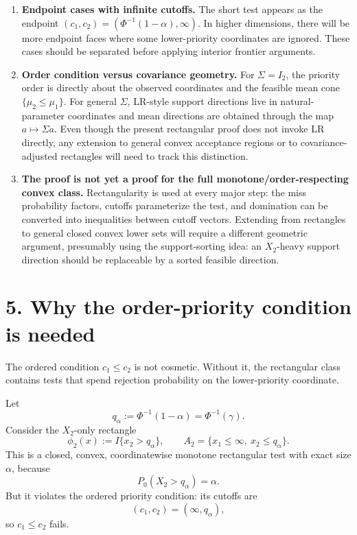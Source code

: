\documentclass[12pt]{article}
\theoremstyle{definition}
\theoremstyle{remark}
\begin{document}
\begin{enumerate}[label=\textbf{(E\arabic*)},leftmargin=2.4em]
\item \textbf{Endpoint cases with infinite cutoffs.}
The short test appears as the endpoint $(c_1,c_2)=(\Phi^{-1}(1-\alpha),\infty)$. In higher dimensions, there will be more endpoint faces where some lower-priority coordinates are ignored. These cases should be separated before applying interior frontier arguments.

\item \textbf{Order condition versus covariance geometry.}
For $\Sigma=I_2$, the priority order is directly about the observed coordinates and the feasible mean cone $\{\mu_2\le\mu_1\}$. For general $\Sigma$, LR-style support directions live in natural-parameter coordinates and mean directions are obtained through the map $a\mapsto\Sigma a$. Even though the present rectangular proof does not invoke LR directly, any extension to general convex acceptance regions or to covariance-adjusted rectangles will need to track this distinction.

\item \textbf{The proof is not yet a proof for the full monotone/order-respecting convex class.}
Rectangularity is used at every major step: the miss probability factors, cutoffs parameterize the test, and domination can be converted into inequalities between cutoff vectors. Extending from rectangles to general closed convex lower sets will require a different geometric argument, presumably using the support-sorting idea: an $X_2$-heavy support direction should be replaceable by a sorted feasible direction.
\end{enumerate}

\section*{5. Why the order-priority condition is needed}

The ordered condition $c_1\le c_2$ is not cosmetic. Without it, the rectangular class contains tests that spend rejection probability on the lower-priority coordinate.

Let
\[
q_\alpha:=\Phi^{-1}(1-\alpha)=\Phi^{-1}(\gamma).
\]
Consider the $X_2$-only rectangle
\[
\phi_2(x):=I\{x_2>q_\alpha\},
\qquad
A_2=\{x_1\le\infty,\ x_2\le q_\alpha\}.
\]
This is a closed, convex, coordinatewise monotone rectangular test with exact size $\alpha$, because
\[
P_0(X_2>q_\alpha)=\alpha.
\]
But it violates the ordered priority condition: its cutoffs are
\[
(c_1,c_2)=(\infty,q_\alpha),
\]
so $c_1\le c_2$ fails.
\end{document}
